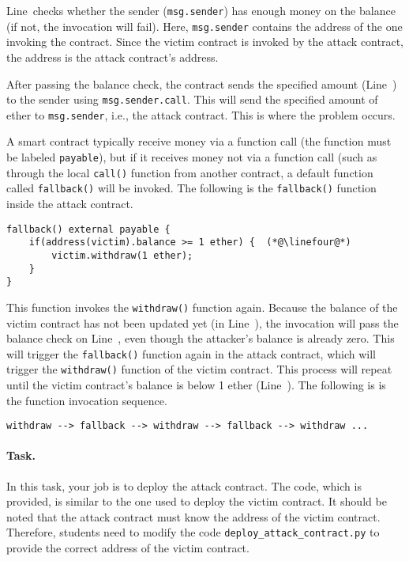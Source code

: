 Line~\lineone checks whether the sender (\texttt{msg.sender})
has enough money on the balance (if not, the invocation will fail). 
Here, \texttt{msg.sender} contains the address of the one 
invoking the contract. Since the victim contract is invoked by the 
attack contract, the address is the attack contract's address.

After passing the balance check, the contract 
sends the specified amount (Line~\linetwo) 
to the sender using \texttt{msg.sender.call}. This will
send the specified amount of ether to \texttt{msg.sender}, 
i.e., the attack contract. This is where the problem occurs. 

A smart contract typically receive money via a function call 
(the function must be labeled \texttt{payable}), but if it receives
money not via a function call (such as through the 
local \texttt{call()} function from another contract,
a default function called \texttt{fallback()} will be 
invoked. The following is the \texttt{fallback()}
function inside the attack contract. 

\begin{lstlisting}[language=Solidity]
fallback() external payable {
    if(address(victim).balance >= 1 ether) {  (*@\linefour@*) 
        victim.withdraw(1 ether);
    } 
}
\end{lstlisting}
 
This function invokes the \texttt{withdraw()} function again.  
Because the balance of the victim contract has not 
been updated yet (in Line~\linethree), 
the invocation will pass the balance check on 
Line~\lineone, even though the 
attacker's balance is already zero. This will trigger 
the \texttt{fallback()} function again in the attack contract,
which will trigger the \texttt{withdraw()} function of the 
victim contract. This process will repeat until the 
victim contract's balance is below 1 ether (Line~\linefour). 
The following is is the function invocation sequence. 

\begin{lstlisting}
withdraw --> fallback --> withdraw --> fallback --> withdraw ...
\end{lstlisting}


\paragraph{Task.}  In this task, your job is to deploy the 
attack contract. The code, which is provided, 
is similar to the one used 
to deploy the victim contract. It should be noted that 
the attack contract must know the address of the victim contract.
Therefore, students need to modify the code \texttt{deploy\_attack\_contract.py}
to provide the correct address of the victim contract. 

